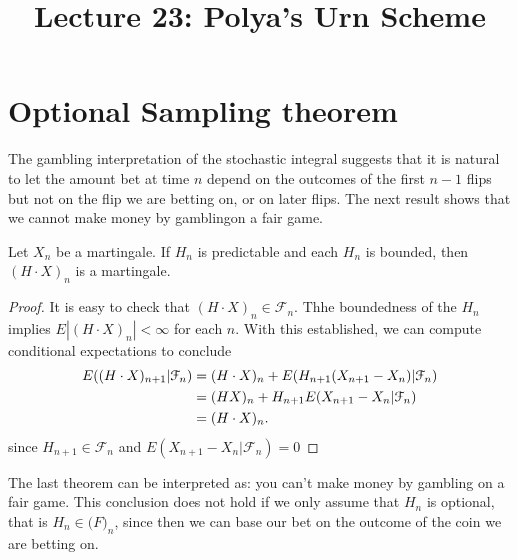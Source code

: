 \documentclass[a4paper,english,10pt]{article}
\title{Lecture 23: Polya's Urn Scheme}
\author{}
\begin{document}
\maketitle
\section{Optional Sampling theorem}
The gambling interpretation of the stochastic integral suggests that it is natural to let the amount bet at time $n$ depend on the outcomes of the first $n-1$ flips but not on the flip we are betting on, or on later flips. The next result shows that we cannot make money by gamblingon a fair game.

\begin{thm}Let $X_n$ be a martingale. If $H_n$ is predictable and each $H_n$ is bounded, then $(H\cdot X)_n$ is a martingale.
\end{thm}
\begin{proof} It is easy to check that $(H\cdot X)_n \in \mathcal{F}_n$. Thhe boundedness of the $H_n$ implies $E|(H\cdot X)_n|<\infty$ for each $n$. With this established, we can compute conditional expectations to conclude
\begin{align*}
E((H\cdot X)_{n+1}| \mathcal{F}_n)&=(H\cdot X)_n+E(H_{n+1}(X_{n+1}-X_n)| \mathcal{F}_n)\\
       &=(HX)_n+H_{n+1}E(X_{n+1}-X_n| \mathcal{F}_n)\\
       &=(H\cdot X)_n.\qedhere
\end{align*}
since $H_{n+1}\in \mathcal{F}_n$ and $E(X_{n+1}-X_n| \mathcal{F}_n)=0$
\end{proof}
The last theorem can be interpreted as: you can't make money by gambling on a fair game. This conclusion does not hold if we only assume that $H_n$ is optional, that is $H_n\in \mathcal(F)_n$, since then we can base our bet on the outcome of the coin we are betting on.
\end{document}
